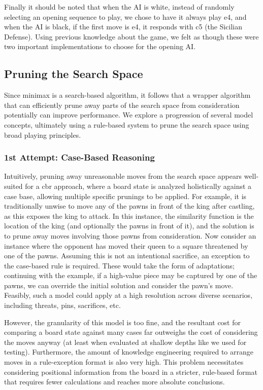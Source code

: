\documentclass[letterpaper]{article}
\begin{document}
Finally it should be noted that when the AI is white, instead of randomly selecting an opening sequence to play, we chose to have it always play e4, and when the AI is black, if the first move is e4, it responds with c5 (the Sicilian Defense). Using previous knowledge about the game, we felt as though these were two important implementations to choose for the opening AI.

\subsection{Pruning the Search Space}
Since minimax is a search-based algorithm, it follows that a wrapper algorithm that can efficiently prune away parts of the search space from consideration potentially can improve performance.  We explore a progression of several model concepts, ultimately using a rule-based system to prune the search space using broad playing principles.

\subsubsection{1st Attempt: Case-Based Reasoning}
Intuitively, pruning away unreasonable moves from the search space appears well-suited for a \acrshort{cbr} approach, where a board state is analyzed holistically against a case base, allowing multiple specific prunings to be applied.  For example, it is traditionally unwise to move any of the pawns in front of the king after castling, as this exposes the king to attack.  In this instance, the similarity function is the location of the king (and optionally the pawns in front of it), and the solution is to prune away moves involving those pawns from consideration.  Now consider an instance where the opponent has moved their queen to a square threatened by one of the pawns.  Assuming this is not an intentional sacrifice, an exception to the case-based rule is required.  These would take the form of adaptations; continuing with the example, if a high-value piece may be captured by one of the pawns, we can override the initial solution and consider the pawn's move.  Feasibly, such a model could apply at a high resolution across diverse scenarios, including threats, pins, sacrifices, etc.

However, the granularity of this model is too fine, and the resultant cost for comparing a board state against many cases far outweighs the cost of considering the moves anyway (at least when evaluated at shallow depths like we used for testing).  Furthermore, the amount of knowledge engineering required to arrange moves in a rule-exception format is also very high.  This problem necessitates considering positional information from the board in a stricter, rule-based format that requires fewer calculations and reaches more absolute conclusions.
\end{document}
